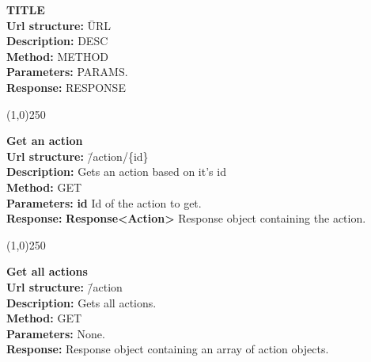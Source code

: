 \documentclass[11pt]{article}
\begin{document}
\begin{tabbing}
\textbf{TITLE} \\
\textcolor{black!60}{\textbf{Url structure:}} \hspace{0.2in} \= URL \\
\textcolor{black!60}{\textbf{Description:}}  \> DESC \\
\textcolor{black!60}{\textbf{Method:}} \> METHOD \\
\textcolor{black!60}{\textbf{Parameters:}} \> PARAMS. \\
\textcolor{black!60}{\textbf{Response:}} \> RESPONSE
\end{tabbing}

\begin{center}\line(1,0){250}\end{center}

\begin{tabbing}
\textbf{Get an action} \\
\textcolor{black!60}{\textbf{Url structure:}} \hspace{0.2in} \= /action/\{id\} \\
\textcolor{black!60}{\textbf{Description:}}  \> Gets an action based on it's id \\
\textcolor{black!60}{\textbf{Method:}} \> GET \\
\textcolor{black!60}{\textbf{Parameters:}} \> \textbf{id} Id of the action to get. \\
\textcolor{black!60}{\textbf{Response:}} \> \textbf{Response<Action>} Response object containing the action.
\end{tabbing}

\begin{center}\line(1,0){250}\end{center}

\begin{tabbing}
\textbf{Get all actions} \\
\textcolor{black!60}{\textbf{Url structure:}} \hspace{0.2in} \= /action \\
\textcolor{black!60}{\textbf{Description:}}  \> Gets all actions. \\
\textcolor{black!60}{\textbf{Method:}} \> GET \\
\textcolor{black!60}{\textbf{Parameters:}} \> None. \\
\textcolor{black!60}{\textbf{Response:}} \> Response object containing an array of action objects.
\end{tabbing}
\end{document}
